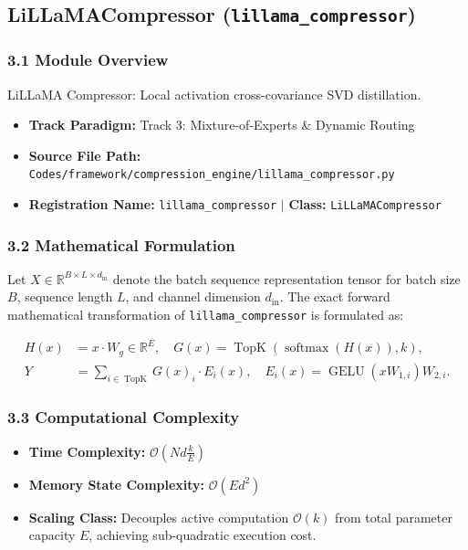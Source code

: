 \subsection{LiLLaMACompressor (\texttt{lillama\_compressor})}
\label{sec:app_module_lillama\_compressor}

\subsubsection*{3.1 Module Overview}
LiLLaMA Compressor: Local activation cross-covariance SVD distillation.
\begin{itemize}
    \item \textbf{Track Paradigm:} Track 3: Mixture-of-Experts & Dynamic Routing
    \item \textbf{Source File Path:} \texttt{Codes/framework/compression\_engine/lillama\_compressor.py}
    \item \textbf{Registration Name:} \texttt{lillama\_compressor} $\mid$ \textbf{Class:} \texttt{LiLLaMACompressor}
\end{itemize}

\subsubsection*{3.2 Mathematical Formulation}
Let $X \in \mathbb{R}^{B \times L \times d_{\text{in}}}$ denote the batch sequence representation tensor for batch size $B$, sequence length $L$, and channel dimension $d_{\text{in}}$. The exact forward mathematical transformation of \texttt{lillama\_compressor} is formulated as:

\begin{align}
H(x) &= x \cdot W_g \in \mathbb{R}^{E}, \quad G(x) = \operatorname{TopK}\left(\operatorname{softmax}(H(x)), k\right), \\
Y &= \sum_{i \in \operatorname{TopK}} G(x)_i \cdot E_i(x), \quad E_i(x) = \operatorname{GELU}(x W_{1, i}) W_{2, i}.
\end{align}


\subsubsection*{3.3 Computational Complexity}
\begin{itemize}
    \item \textbf{Time Complexity:} $\mathcal{O}(N d \frac{k}{E})$
    \item \textbf{Memory State Complexity:} $\mathcal{O}(E d^2)$
    \item \textbf{Scaling Class:} Decouples active computation $\mathcal{O}(k)$ from total parameter capacity $E$, achieving sub-quadratic execution cost.
\end{itemize}

